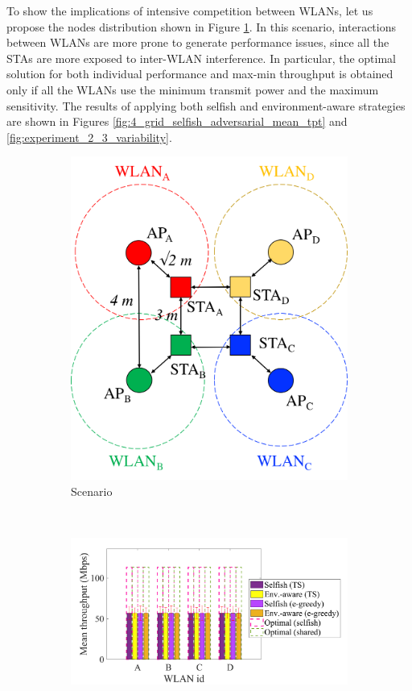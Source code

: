 \documentclass[preprint,12pt]{elsarticle}
\begin{document}
To show the implications of intensive competition between WLANs, let us propose the nodes distribution shown in Figure \ref{fig:adversarial_issues_scenario}. In this scenario, interactions between WLANs are more prone to generate performance issues, since all the STAs are more exposed to inter-WLAN interference. In particular, the optimal solution for both individual performance and max-min throughput is obtained only if all the WLANs use the minimum transmit power and the maximum sensitivity. The results of applying both selfish and environment-aware strategies are shown in Figures \ref{fig:4_grid_selfish_adversarial_mean_tpt} and \ref{fig:experiment_2_3_variability}. 
\begin{figure}[h!!!!]
	\centering
	\begin{subfigure}[b]{0.3\textwidth}
		\includegraphics[width=\textwidth]{s6_new}
		\caption{Scenario}
		\label{fig:adversarial_issues_scenario}
	\end{subfigure}\\
	\begin{subfigure}[b]{0.48\textwidth}
		\includegraphics[width=\textwidth]{fig_2_3_adversarial}

\end{subfigure}
\end{figure}
\end{document}
